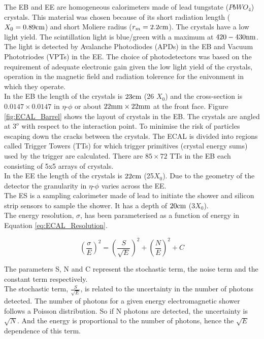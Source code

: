 The EB and EE are homogeneous calorimeters made of lead tungstate ($PbWO_{4}$)
crystals. This material was chosen because of its short radiation length ($X_{0}
= 0.89\mbox{cm}$) and short Moliere radius ($r_{m} = 2.2\mbox{cm}$). The crystals have a low
light yield. The scintillation light is blue/green with a maximum at 
$420-430\mbox{nm}$. The light is detected by Avalanche Photodiodes (APDs) in the EB 
and Vacuum Phototriodes (VPTs) in the EE. The choice of photodetectors was based
on the requirement of adequate electronic gain given the low light yield of the 
crystals, operation in the magnetic field and radiation tolerence for the 
enivonment in which they operate. \\

In the EB the length of the crystals is $23\mbox{cm}$ (26 $X_{0}$) and the 
cross-section is $0.0147\times0.0147$ in $\eta$-$\phi$ or about 
$22\mbox{mm}\times22\mbox{mm}$ at the front face. Figure \ref{fig:ECAL_Barrel} shows the
layout of crystals in the EB. The crystals are angled at $3^{o}$ with
respect to the interaction point. To minimise the risk of particles escaping 
down the cracks between the crystals. The ECAL is divided into regions called 
Trigger Towers (TTs) for which trigger primitives (crystal energy sums) used by 
the trigger are calculated. There are $85\times72$ TTs in the EB each consisting
of 5x5 arrays of crystals. \\

In the EE the length of the crystals is $22\mbox{cm}$ (25$X_{0}$). Due to the geometry
of the detector the granularity in $\eta$-$\phi$ varies across the EE. \\

The ES is a sampling calorimeter made of lead to initiate the shower and
silicon strip sensors to sample the shower. It has a depth of $20\mbox{cm}$ 
($3X_{0}$). \\

The energy resolution, $\sigma$, has been parameterised as a function of energy 
in Equation \ref{eq:ECAL_Resolution}. 

\begin{equation}
\left( \frac{\sigma}{E} \right)^{2} = \left( \frac{S}{\sqrt{E}} \right)^{2} +
\left( \frac{N}{E} \right)^{2} + C
\label{eq:ECAL_Resolution}
\end{equation}

The parameters S, N and C represent the stochastic term, the noise term and the
constant term respectively. \\

The stochastic term, $\frac{S}{\sqrt{E}}$, is related to the uncertainty in the 
number of photons detected. The number of photons for a given energy 
electromagnetic shower follows a Poisson distribution. So if N photons are 
detected, the uncertainty is $\sqrt{N}$. And the energy is proportional to the 
number of photons, hence the $\sqrt{E}$ dependence of this term. \\

